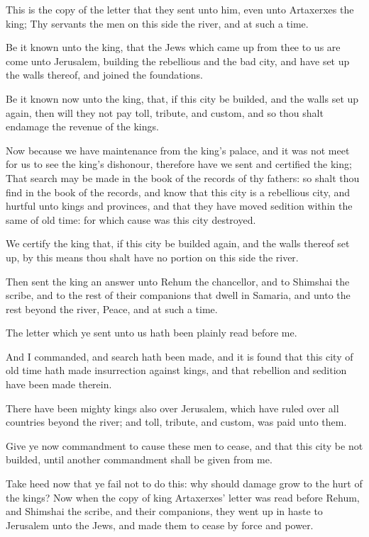 \verse This is the copy of the letter that they sent unto him, even unto Artaxerxes the king; Thy servants the men on this side the river, and at such a time.

\verse Be it known unto the king, that the Jews which came up from thee to us are come unto Jerusalem, building the rebellious and the bad city, and have set up the walls thereof, and joined the foundations.

\verse Be it known now unto the king, that, if this city be builded, and the walls set up again, then will they not pay toll, tribute, and custom, and so thou shalt endamage the revenue of the kings.

\verse Now because we have maintenance from the king's palace, and it was not meet for us to see the king's dishonour, therefore have we sent and certified the king; \verse That search may be made in the book of the records of thy fathers: so shalt thou find in the book of the records, and know that this city is a rebellious city, and hurtful unto kings and provinces, and that they have moved sedition within the same of old time: for which cause was this city destroyed.

\verse We certify the king that, if this city be builded again, and the walls thereof set up, by this means thou shalt have no portion on this side the river.

\verse Then sent the king an answer unto Rehum the chancellor, and to Shimshai the scribe, and to the rest of their companions that dwell in Samaria, and unto the rest beyond the river, Peace, and at such a time.

\verse The letter which ye sent unto us hath been plainly read before me.

\verse And I commanded, and search hath been made, and it is found that this city of old time hath made insurrection against kings, and that rebellion and sedition have been made therein.

\verse There have been mighty kings also over Jerusalem, which have ruled over all countries beyond the river; and toll, tribute, and custom, was paid unto them.

\verse Give ye now commandment to cause these men to cease, and that this city be not builded, until another commandment shall be given from me.

\verse Take heed now that ye fail not to do this: why should damage grow to the hurt of the kings?  \verse Now when the copy of king Artaxerxes' letter was read before Rehum, and Shimshai the scribe, and their companions, they went up in haste to Jerusalem unto the Jews, and made them to cease by force and power.


